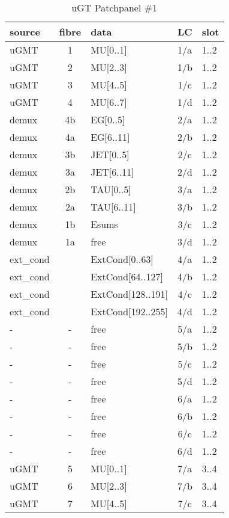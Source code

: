 \begin{longtable}{|l|c|l|c|l|}
\caption{uGT Patchpanel \#1}
    \label{tab:app:ugt_opt_pp_1}\\
\hline
\textbf{source}& \textbf{fibre}& \textbf{data}& \textbf{LC}& \textbf{slot}\\
\hline
\hline
\endhead
uGMT  & 1   & MU[0..1]   & 1/a  & 1..2 \\\hline
uGMT  & 2   & MU[2..3]   & 1/b  & 1..2 \\\hline
uGMT  & 3   & MU[4..5]   & 1/c  & 1..2 \\\hline
uGMT  & 4   & MU[6..7]   & 1/d  & 1..2 \\\hline
demux & 4b  & EG[0..5]   & 2/a  & 1..2 \\\hline
demux & 4a  & EG[6..11]  & 2/b  & 1..2 \\\hline
demux & 3b  & JET[0..5]  & 2/c  & 1..2 \\\hline
demux & 3a  & JET[6..11] & 2/d  & 1..2 \\\hline
demux & 2b  & TAU[0..5]  & 3/a  & 1..2 \\\hline
demux & 2a  & TAU[6..11] & 3/b  & 1..2 \\\hline
demux & 1b  & Esums      & 3/c  & 1..2 \\\hline
demux & 1a  & free      & 3/d  & 1..2 \\\hline
ext\_cond &     & ExtCond[0..63]    & 4/a  & 1..2 \\\hline
ext\_cond &     & ExtCond[64..127]  & 4/b  & 1..2 \\\hline
ext\_cond &     & ExtCond[128..191] & 4/c  & 1..2 \\\hline
ext\_cond &     & ExtCond[192..255] & 4/d  & 1..2 \\\hline
- & - & free & 5/a  & 1..2 \\\hline
- & - & free & 5/b  & 1..2 \\\hline
- & - & free & 5/c  & 1..2 \\\hline
- & - & free & 5/d  & 1..2 \\\hline
- & - & free & 6/a  & 1..2 \\\hline
- & - & free & 6/b  & 1..2 \\\hline
- & - & free & 6/c  & 1..2 \\\hline
- & - & free & 6/d  & 1..2 \\\hline
\hline
uGMT  & 5   & MU[0..1]   & 7/a  & 3..4 \\\hline
uGMT  & 6   & MU[2..3]   & 7/b  & 3..4 \\\hline
uGMT  & 7   & MU[4..5]   & 7/c  & 3..4 \\\hline

\end{longtable}
